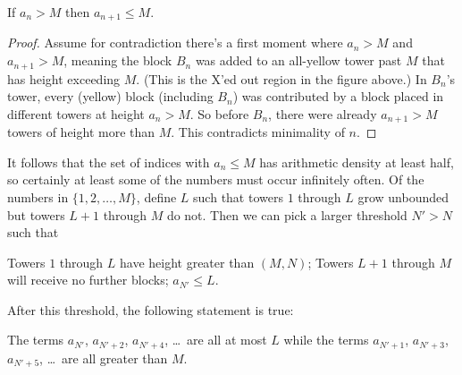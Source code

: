 \documentclass[11pt]{scrartcl}
\begin{document}
\begin{claim*}
  If $a_n > M$ then $a_{n+1} \le M$.
\end{claim*}
\begin{proof}
  Assume for contradiction there's a first moment where $a_n > M$ and $a_{n+1} > M$,
  meaning the block $B_n$ was added to an all-yellow tower past $M$
  that has height exceeding $M$.
  (This is the X'ed out region in the figure above.)
  In $B_n$'s tower, every (yellow) block (including $B_n$)
  was contributed by a block placed in different towers at height $a_n > M$.
  So before $B_n$, there were already $a_{n+1} > M$ towers of height more than $M$.
  This contradicts minimality of $n$.
\end{proof}

It follows that the set of indices with $a_n \le M$
has arithmetic density at least half, so certainly
at least some of the numbers must occur infinitely often.
Of the numbers in $\{1,2,\dots,M\}$,
define $L$ such that towers $1$ through $L$ grow unbounded
but towers $L+1$ through $M$ do not.
Then we can pick a larger threshold $N' > N$ such that
\begin{itemize}
  \ii Towers $1$ through $L$ have height greater than $(M,N)$;
  \ii Towers $L+1$ through $M$ will receive no further blocks;
  \ii $a_{N'} \le L$.
\end{itemize}
After this threshold, the following statement is true:
\begin{claim*}
  The terms $a_{N'}$, $a_{N' + 2}$, $a_{N' + 4}$, \dots\ are all at most $L$ while
  the terms $a_{N' + 1}$, $a_{N' + 3}$, $a_{N' + 5}$, \dots\ are all greater than $M$.
\end{claim*}
\end{document}
